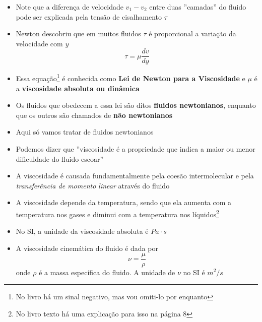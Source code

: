 \documentclass[t,%
brazilian,%
11pt,%
aspectratio=169,%
table%
]{beamer}
\begin{document}
\begin{frame}
    \begin{itemize}
        \item Note que a diferença de velocidade \(v_1-v_2\) entre duas ''camadas'' do fluido pode ser
            explicada pela tensão de cisalhamento \(\tau\)
        \item Newton descobriu que em muitos fluidos \(\tau\) é proporcional a variação da velocidade com \(y\)
            \[
                \tau = \mu \frac{dv}{dy}
            \]
        \item Essa equação\footnote{No livro há um sinal negativo, mas vou
            omiti-lo por enquanto} é conhecida como \textbf{Lei de Newton para
            a Viscosidade} e \(\mu\) é a \textbf{viscosidade absoluta ou dinâmica}
        \item Os fluidos que obedecem a essa lei são ditos \textbf{fluidos newtonianos}, enquanto que
            os outros são chamados de \textbf{não newtonianos}
        \item Aqui só vamos tratar de fluidos newtonianos
    \end{itemize}
\end{frame}

\begin{frame}
    \begin{itemize}
        \item Podemos dizer que ''viscosidade é a propriedade que indica a maior ou menor dificuldade
            do fluido escoar''
        \item A viscosidade é causada fundamentalmente pela coesão intermolecular 
            e pela \textit{transferência de momento linear} através do fluido
        \item A viscosidade depende da temperatura, sendo que ela aumenta com a temperatura nos 
            gases e diminui com a temperatura nos líquidos\footnote{No livro texto há uma explicação para isso na página 8}
        \item No SI, a unidade da viscosidade absoluta é \(\si{Pa\cdot s}\)
        \item A viscosidade cinemática do fluido é dada por
            \[
                \nu = \frac{\mu}{\rho}
            \]
            onde \(\rho\) é a massa específica do fluido. A unidade de \(\nu\) no SI é 
            \(\si{m^2/s}\)
    \end{itemize}
\end{frame}
\end{document}
